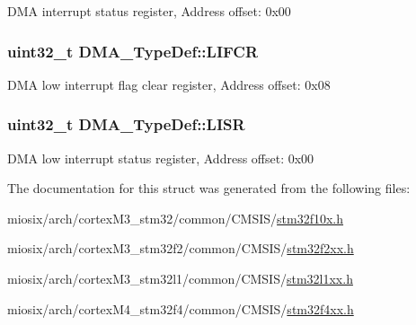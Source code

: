 D\-M\-A interrupt status register, Address offset\-: 0x00 \hypertarget{struct_d_m_a___type_def_a11adb689c874d38b49fa44990323b653}{
\subsubsection[{L\-I\-F\-C\-R}]{ uint32\-\_\-t D\-M\-A\-\_\-\-Type\-Def\-::\-L\-I\-F\-C\-R}}\label{struct_d_m_a___type_def_a11adb689c874d38b49fa44990323b653}
D\-M\-A low interrupt flag clear register, Address offset\-: 0x08 \hypertarget{struct_d_m_a___type_def_aacb4a0977d281bc809cb5974e178bc2b}{
\subsubsection[{L\-I\-S\-R}]{ uint32\-\_\-t D\-M\-A\-\_\-\-Type\-Def\-::\-L\-I\-S\-R}}\label{struct_d_m_a___type_def_aacb4a0977d281bc809cb5974e178bc2b}
D\-M\-A low interrupt status register, Address offset\-: 0x00 

The documentation for this struct was generated from the following files\-:\begin{DoxyCompactItemize}
\item 
miosix/arch/cortex\-M3\-\_\-stm32/common/\-C\-M\-S\-I\-S/\hyperlink{stm32f10x_8h}{stm32f10x.\-h}\item 
miosix/arch/cortex\-M3\-\_\-stm32f2/common/\-C\-M\-S\-I\-S/\hyperlink{stm32f2xx_8h}{stm32f2xx.\-h}\item 
miosix/arch/cortex\-M3\-\_\-stm32l1/common/\-C\-M\-S\-I\-S/\hyperlink{stm32l1xx_8h}{stm32l1xx.\-h}\item 
miosix/arch/cortex\-M4\-\_\-stm32f4/common/\-C\-M\-S\-I\-S/\hyperlink{stm32f4xx_8h}{stm32f4xx.\-h}\end{DoxyCompactItemize}
